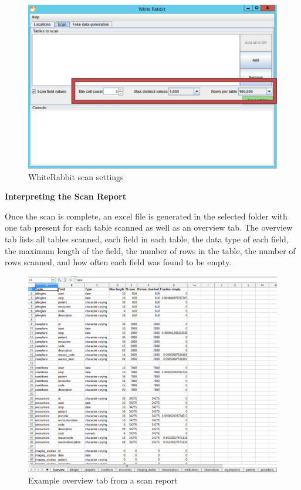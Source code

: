 \documentclass[11pt]{book}
\theoremstyle{definition}
\theoremstyle{definition}
\theoremstyle{definition}
\theoremstyle{remark}
\begin{document}
\begin{figure}
\includegraphics[width=1\linewidth]{images/ExtractTransformLoad/WhiteRabbitScanSettings} \caption{WhiteRabbit scan settings}\label{fig:WhiteRabbitScanSettings}
\end{figure}

\textbf{Interpreting the Scan Report}

Once the scan is complete, an excel file is generated in the selected folder with one tab present for each table scanned as well as an overview tab. The overview tab lists all tables scanned, each field in each table, the data type of each field, the maximum length of the field, the number of rows in the table, the number of rows scanned, and how often each field was found to be empty.

\begin{figure}
\includegraphics[width=1\linewidth]{images/ExtractTransformLoad/ScanOverviewTab} \caption{Example overview tab from a scan report}\label{fig:ScanOverviewTab}
\end{figure}
\end{document}
